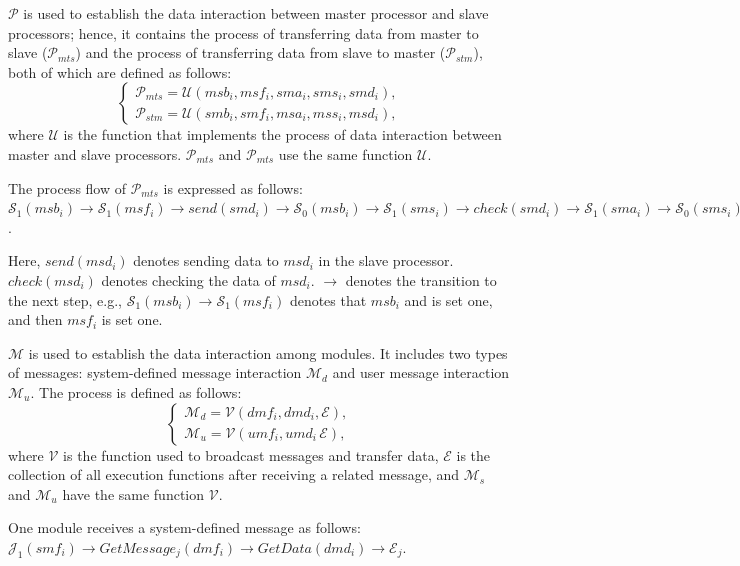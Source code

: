 \documentclass[journal,UTF8]{IEEEtran}
\begin{document}
	$\mathcal{P}$ is used to establish the data interaction between master processor and slave processors; hence, it contains the process of transferring data from master to slave ($\mathcal{P}_{mts}$) and the process of transferring data from slave to master ($\mathcal{P}_{stm}$), both of which are defined as follows:
	\begin{equation}
	\left\{
	\begin{array}{l}
	\mathcal{P}_{mts} = \mathcal{U} (msb_i,msf_i,sma_i,sms_i,smd_i),\\
	\mathcal{P}_{stm} = \mathcal{U} (smb_i,smf_i,msa_i,mss_i,msd_i),
	\end{array}
	\right.
	\end{equation}
	where $\mathcal{U}$ is the function that implements the process of data interaction between master and slave processors. $\mathcal{P}_{mts}$ and $\mathcal{P}_{mts}$ use the same function $\mathcal{U}$.
	
	The process flow of $\mathcal{P}_{mts}$ is expressed  as follows:
	$\mathcal{S}_1(msb_i)\to\mathcal{S}_1(msf_i)\to send(smd_i)\to\mathcal{S}_0(msb_i)\to\mathcal{S}_1(sms_i)\to check(smd_i)\to\mathcal{S}_1(sma_i)\to\mathcal{S}_0(sms_i)\to\mathcal{S}_0(sma_i)\to\mathcal{S}_0(msf_i)$.
	
	Here, $send(msd_i)$ denotes sending data to $msd_i$ in the slave processor. $check(msd_i)$ denotes checking the  data of $msd_i$. $\to$ denotes the transition to the next step, e.g., $\mathcal{S}_1(msb_i)\to\mathcal{S}_1(msf_i)$ denotes that $msb_i$ and is set one, and then $msf_i$ is set one.
	
	$\mathcal{M}$ is used to establish the data interaction among modules. It includes two types of messages: system-defined message interaction $\mathcal{M}_{d}$ and user message interaction $\mathcal{M}_{u}$. The process is defined as follows:
	\begin{equation}
	\left\{
	\begin{array}{l}
	\mathcal{M}_{d} = \mathcal{V} (dmf_i,dmd_i,\mathcal{E}),\\
	\mathcal{M}_{u} = \mathcal{V} (umf_i,umd_i\,\mathcal{E}),
	\end{array}
	\right.
	\end{equation}
	where $\mathcal{V}$ is the function used to broadcast messages and transfer data, $\mathcal{E}$ is the collection of all execution functions after receiving a related message, and $\mathcal{M}_{s}$ and $\mathcal{M}_{u}$ have the same function $\mathcal{V}$.
	
	One module receives a system-defined message as follows:
	$\mathcal{J}_1(smf_i)\to GetMessage_{j}(dmf_i)\to GetData(dmd_i)\to\mathcal{E}_j$.
	
\end{document}
